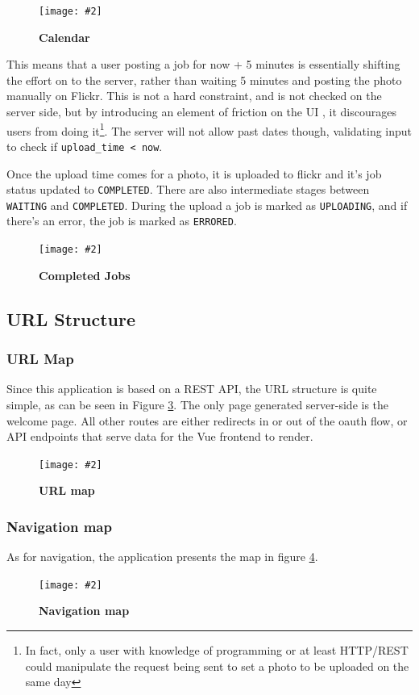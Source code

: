\documentclass[10pt, a4paper]{article}
\newcommand{\figuremacro}[5]{
\begin{figure}[#1]
\centering
\texttt{[image: \#2]}
\caption[#3]{\textbf{#3}#4}
\label{fig:#2}
\end{figure}
}
\begin{document}
        \figuremacro{h}{time-picker}{Calendar}{}{1.0}

        This means that a user posting a job for now + 5 minutes is essentially shifting the effort on to the server, rather than waiting 5 minutes and posting the photo manually on Flickr.
        This is not a hard constraint, and is not checked on the server side, but by introducing an element of friction on the UI \cite{ui_friction}, it discourages users from doing it\footnote{\label{ft:friction} In fact, only a user with knowledge of programming or at least HTTP/REST could manipulate the request being sent to set a photo to be uploaded on the same day}. The server will not allow past dates though, validating input to check if \texttt{upload\_time < now}.

        Once the upload time comes for a photo, it is uploaded to flickr and it's job status updated to \texttt{COMPLETED}. There are also intermediate stages between \texttt{WAITING} and \texttt{COMPLETED}. During the upload a job is marked as \texttt{UPLOADING}, and if there's an error, the job is marked as \texttt{ERRORED}.

				\figuremacro{h}{completed-jobs}{Completed Jobs}{}{1.0}        

        \subsection{URL Structure}
        \subsubsection{URL Map}
        Since this application is based on a REST API, the URL structure is quite simple, as can be seen in Figure \ref{fig:url-map}. The only page generated server-side is the welcome page. All other routes are either redirects in or out of the oauth flow, or API endpoints that serve data for the Vue frontend to render.


        \figuremacro{h}{url-map}{URL map}{}{1.0}


        \subsubsection{Navigation map}
        As for navigation, the application presents the map in figure \ref{fig:nav-map}.

        \figuremacro{h}{nav-map}{Navigation map}{}{1.0}
\end{document}
